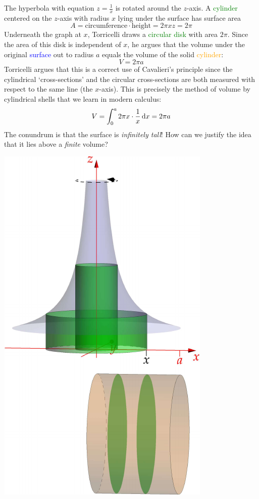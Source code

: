 \begin{minipage}[t]{0.58\linewidth}\vspace{-5pt}
	The hyperbola with equation $z=\frac 1x$ is rotated around the $z$-axis. A \textcolor{Green}{cylinder} centered on the $z$-axis with radius $x$ lying under the surface has surface area
	\[
		A=\text{circumference}\cdot\text{height}=2\pi xz=2\pi
	\]
	Underneath the graph at $x$, Torricelli draws a \textcolor{Green}{circular disk} with area $2\pi$. Since the area of this disk is independent of $x$, he argues that the volume under the original \textcolor{blue}{surface} out to radius $a$ equals the volume of the solid \textcolor{orange}{cylinder}:
	\[
		V=2\pi a
	\]
	Torricelli argues that this is a correct use of Cavalieri's principle since the cylindrical `cross-sections' and the circular cross-sections are both measured with respect to the same line (the $x$-axis).\smallbreak
	This is precisely the method of volume by cylindrical shells that we learn in modern calculus:
	\[
		V=\int_0^a 2\pi x\cdot\frac 1x\,{\mathrm{d} x}=2\pi a
	\]
	The conundrum is that the surface is \emph{infinitely tall}! How can we justify the idea that it lies above a \emph{finite} volume?
\end{minipage}
\hfill
\begin{minipage}[t]{0.41\linewidth}\vspace{-10pt}
	\flushright
	\href{http://www.math.uci.edu/~ndonalds/math184/analytic-torri2.html}{
		\includegraphics{analytic-torri2}
	}
\end{minipage}
\bigbreak

